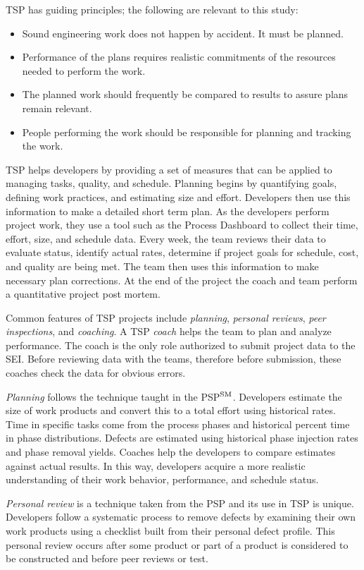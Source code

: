 TSP has guiding principles; the following are relevant to this study:
\begin{itemize}
\item  Sound engineering work does not happen by accident. It must be planned.
\item  Performance of the plans requires realistic commitments of the resources needed to perform the work.
\item  The planned work should frequently be compared to  results to assure plans remain relevant.
\item  People performing the work should be responsible for planning and tracking the work.
\end{itemize}

TSP helps developers by providing a set of measures that can be applied to managing tasks, quality, and schedule. Planning begins by quantifying goals, defining work practices, and estimating size and effort. Developers then use this information to make a detailed short term plan. As the developers perform project work, they use a tool such as the Process Dashboard to collect their time, effort, size, and schedule data. Every week, the team reviews their data to evaluate status, identify actual rates, determine if project goals for schedule, cost, and quality are being met. The team then uses this information to make necessary plan corrections. At the end of the project the coach and team perform a quantitative project post mortem.

Common features of TSP projects include {\em planning}, {\em personal reviews}, {\em peer inspections}, and {\em coaching}.
A TSP {\em coach} helps the team to plan and analyze performance. The coach is the only role authorized to submit project data to the SEI.
Before reviewing data with the teams, therefore before submission, these coaches check the data for obvious errors.

{\em Planning} follows the technique taught in the PSP$\textsuperscript{SM}$. Developers estimate the size of work products and convert this to a total effort using historical rates. Time in specific tasks come from the  process phases and historical percent time in phase distributions. Defects are estimated using historical phase injection rates and phase removal yields. Coaches help the developers to compare estimates against actual results. In this way, developers acquire a more realistic understanding of their work behavior, performance, and schedule status.

{\em Personal review} is a technique taken from the PSP and its use in TSP is unique.  Developers follow a systematic process to remove defects by  examining their own work products using a checklist built from their personal defect profile. This personal review occurs after some product or part of a product is considered to be constructed and before peer reviews or test. 

